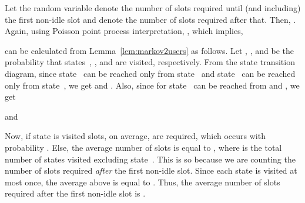 \documentclass[12pt,draftcls,peerreview, onecolumn]{IEEEtran}
\begin{document}
 Let the random variable  denote the number of slots required until (and including) the first non-idle slot and  denote the number of slots required after that. Then, . Again, using Poisson point process interpretation,
   , which implies,


 can be calculated from Lemma~\ref{lem:markov2users} as
follows.  Let , , and  be the probability that
states~, , and  are visited, respectively. From the state
transition diagram, since state~ can be reached only from
state~ and state~ can be reached only from state~, we get
 and .  Also, since for  state~
can be reached from  and , we get

and  


Now, if state  is visited 
slots, on average, are required, which occurs with probability .
Else, the average number of slots is equal to
, where  is the total number of
states visited excluding state~. This is so because we are counting
the number of slots required {\it after} the first non-idle slot.
Since each state is visited at most once, the average above is equal
to .  Thus, the
average number of slots required after the first non-idle slot is
.
\end{document}
